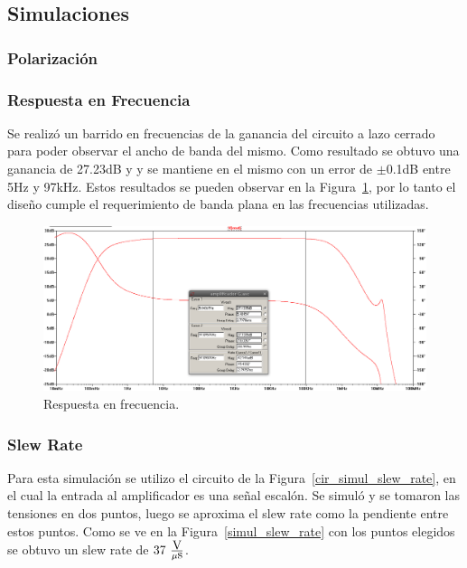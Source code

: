 \subsection{Simulaciones}
\bigskip
\subsubsection{Polarización}

\subsubsection{Respuesta en Frecuencia}

Se realizó un barrido en frecuencias de la ganancia del circuito a lazo cerrado para poder observar el ancho de banda del mismo. Como resultado se obtuvo una ganancia de 27.23dB y y se mantiene en el mismo con un error de $\pm$0.1dB entre 5Hz y 97kHz.
Estos resultados se pueden observar en la Figura~\ref{resp_frec}, por lo tanto el diseño cumple el requerimiento de banda plana en las frecuencias utilizadas. 

\begin{figure}[H]
\centering
\centerline{
\includegraphics[width=\textwidth]{img/ancho_de_banda.png}}
\caption{Respuesta en frecuencia.}
\label{resp_frec} 
\end{figure}

\bigskip
\subsubsection{Slew Rate}

Para esta simulación se utilizo el circuito de la Figura~\ref{cir_simul_slew_rate}, en el cual la entrada al amplificador es una señal escalón. Se simuló y se tomaron las tensiones en dos puntos, luego se aproxima el slew rate como la pendiente entre estos puntos. Como se ve en la Figura~\ref{simul_slew_rate} con los puntos elegidos se obtuvo un slew rate de $37~ \frac{\mbox{V}}{\mu\mbox{s}}$.

